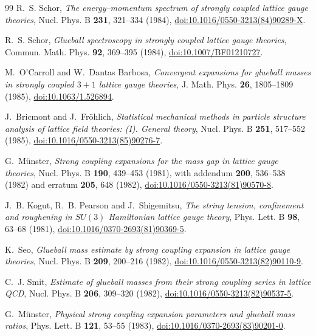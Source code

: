 \documentclass[11pt]{article}
\theoremstyle{plain}
\theoremstyle{definition}
\theoremstyle{remark}
\begin{document}
\begin{thebibliography}{99}
 R.~S. Schor,
  \emph{The energy--momentum spectrum of strongly coupled lattice gauge
  theories}, Nucl. Phys. B \textbf{231}, 321--334 (1984),
  \href{https://doi.org/10.1016/0550-3213(84)90289-X}{doi:10.1016/0550-3213(84)90289-X}.

 R.~S. Schor,
  \emph{Glueball spectroscopy in strongly coupled lattice gauge theories},
  Commun. Math. Phys. \textbf{92}, 369--395 (1984),
  \href{https://doi.org/10.1007/BF01210727}{doi:10.1007/BF01210727}.

 M.~O'Carroll and W.~Dantas Barbosa,
  \emph{Convergent expansions for glueball masses in strongly coupled
  $3+1$ lattice gauge theories}, J. Math. Phys. \textbf{26}, 1805--1809
  (1985),
  \href{https://doi.org/10.1063/1.526894}{doi:10.1063/1.526894}.

 J.~Bricmont and J.~Fr\"ohlich,
  \emph{Statistical mechanical methods in particle structure analysis of
  lattice field theories: (I). General theory}, Nucl. Phys. B \textbf{251},
  517--552 (1985),
  \href{https://doi.org/10.1016/0550-3213(85)90276-7}{doi:10.1016/0550-3213(85)90276-7}.

 G.~M\"unster,
  \emph{Strong coupling expansions for the mass gap in lattice gauge theories},
  Nucl. Phys. B \textbf{190}, 439--453 (1981), with addendum
  \textbf{200}, 536--538 (1982) and erratum \textbf{205}, 648 (1982),
  \href{https://doi.org/10.1016/0550-3213(81)90570-8}{doi:10.1016/0550-3213(81)90570-8}.

 J.~B. Kogut, R.~B. Pearson and J.~Shigemitsu,
  \emph{The string tension, confinement and roughening in $SU(3)$ Hamiltonian
  lattice gauge theory}, Phys. Lett. B \textbf{98}, 63--68 (1981),
  \href{https://doi.org/10.1016/0370-2693(81)90369-5}{doi:10.1016/0370-2693(81)90369-5}.

 K.~Seo,
  \emph{Glueball mass estimate by strong coupling expansion in lattice gauge
  theories}, Nucl. Phys. B \textbf{209}, 200--216 (1982),
  \href{https://doi.org/10.1016/0550-3213(82)90110-9}{doi:10.1016/0550-3213(82)90110-9}.

 C.~J. Smit,
  \emph{Estimate of glueball masses from their strong coupling series in
  lattice QCD}, Nucl. Phys. B \textbf{206}, 309--320 (1982),
  \href{https://doi.org/10.1016/0550-3213(82)90537-5}{doi:10.1016/0550-3213(82)90537-5}.

 G.~M\"unster,
  \emph{Physical strong coupling expansion parameters and glueball mass
  ratios}, Phys. Lett. B \textbf{121}, 53--55 (1983),
  \href{https://doi.org/10.1016/0370-2693(83)90201-0}{doi:10.1016/0370-2693(83)90201-0}.


\end{thebibliography}
\end{document}
